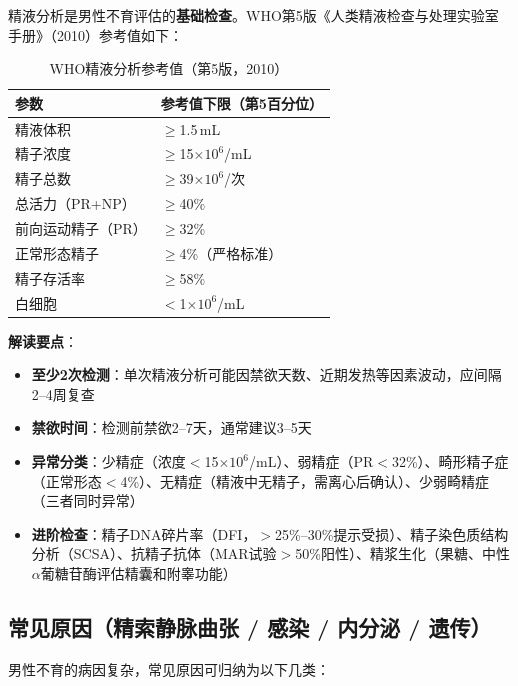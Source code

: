 精液分析是男性不育评估的\textbf{基础检查}。WHO第5版《人类精液检查与处理实验室手册》（2010）参考值如下：

\begin{table}[htbp]
\centering
\caption{WHO精液分析参考值（第5版，2010）}
\label{tab:semen_analysis_who}
\begin{tabularx}{\textwidth}{@{}lX@{}}
    \toprule
    \textbf{参数} & \textbf{参考值下限（第5百分位）} \\
    \midrule
    精液体积 & $\ge$1.5\,mL \\
    精子浓度 & $\ge$15$\times10^6$/mL \\
    精子总数 & $\ge$39$\times10^6$/次 \\
    总活力（PR+NP） & $\ge$40\% \\
    前向运动精子（PR） & $\ge$32\% \\
    正常形态精子 & $\ge$4\%（严格标准） \\
    精子存活率 & $\ge$58\% \\
    白细胞 & $<$1$\times10^6$/mL \\
    \bottomrule
\end{tabularx}
\end{table}

\textbf{解读要点}：
\begin{itemize}[leftmargin=2cm]
	\item \textbf{至少2次检测}：单次精液分析可能因禁欲天数、近期发热等因素波动，应间隔2--4周复查
	\item \textbf{禁欲时间}：检测前禁欲2--7天，通常建议3--5天
	\item \textbf{异常分类}：少精症（浓度$<$15$\times10^6$/mL）、弱精症（PR$<$32\%）、畸形精子症（正常形态$<$4\%）、无精症（精液中无精子，需离心后确认）、少弱畸精症（三者同时异常）
	\item \textbf{进阶检查}：精子DNA碎片率（DFI，$>$25\%--30\%提示受损）、精子染色质结构分析（SCSA）、抗精子抗体（MAR试验$>$50\%阳性）、精浆生化（果糖、中性$\alpha$葡糖苷酶评估精囊和附睾功能）
\end{itemize}

\subsection{常见原因（精索静脉曲张 / 感染 / 内分泌 / 遗传）}

男性不育的病因复杂，常见原因可归纳为以下几类：

